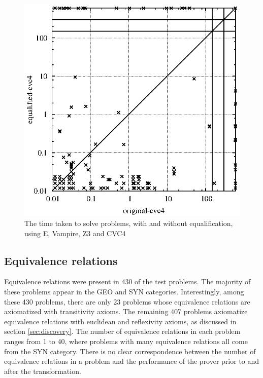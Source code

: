 \documentclass{article}
\begin{document}
\begin{figure}[t]
\begin{center}
\includegraphics[scale=0.65,trim=10mm 0mm 20mm 0mm]{Plots/Equalified/CVC4/test_original_cvc4_equalified_cvc4_300.eps}
\end{center}
\caption{The time taken to solve problems, with and without equalification, using E, Vampire, Z3 and CVC4 }
\label{fig:e_equalified}
\end{figure}

\subsection{Equivalence relations}

Equivalence relations were present in 430 of the test problems. The majority of these problems appear in the GEO and SYN categories. Interestingly, among these 430 problems, there are only 23 problems whose equivalence relations are axiomatized with transitivity axioms. The remaining 407 problems axiomatize equivalence relations with euclidean and reflexivity axioms, as discussed in section \ref{sec:discovery}. The number of equivalence relations in each problem ranges from 1 to 40, where problems with many equivalence relations all come from the SYN category. There is no clear correspondence between the number of equivalence relations in a problem and the performance of the prover prior to and after the transformation. 
\end{document}
